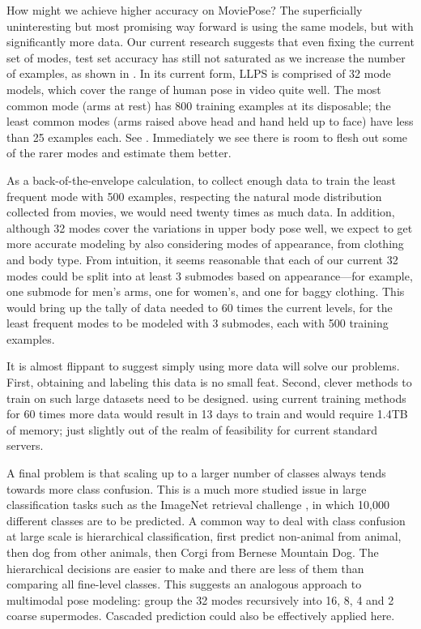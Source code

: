   How might we achieve higher accuracy on MoviePose?  The superficially 
uninteresting but most promising way forward is using the same models, but with 
significantly more data.  Our current research suggests that even fixing the 
current set of modes, test set accuracy has still not saturated as we increase 
the number of examples, as shown in .  In its 
current form, LLPS is comprised of 32 mode models, which cover the range of 
human pose in video quite well.  The most common mode (arms at rest) has 800 
training examples at its disposable; the least common modes (arms raised above 
head and hand held up to face) have less than 25 examples each.  See 
.  Immediately we see there is room to flesh out some 
of the rarer modes and estimate them better.  

As a back-of-the-envelope calculation, to collect enough data to train the 
least frequent mode with 500 examples, respecting the natural mode distribution 
collected from movies, we would need twenty times as much data.  In addition, 
although 32 modes cover the variations in upper body pose well, we expect to 
get more accurate modeling by also considering modes of appearance, from 
clothing and body type.  From intuition, it seems reasonable that each of our 
current 32 modes could be split into at least 3 submodes based on 
appearance---for example, one submode for men's arms, one for women's, and one 
for baggy clothing.  This would bring up the tally of data needed to 60 times 
the current levels, for the least frequent modes to be modeled with 3 submodes, 
each with 500 training examples.

It is almost flippant to suggest simply using more data will solve our 
problems.  First, obtaining and labeling this data is no small feat.  Second, 
clever methods to train on such large datasets need to be designed.  \Naively 
using current training methods for 60 times more data would result in 13 days 
to train and would require 1.4TB of memory; just slightly out of the realm of 
feasibility for current standard servers.  

A final problem is that scaling up to a larger number of classes always tends 
towards more class confusion.  This is a much more studied issue in large 
classification tasks such as the ImageNet retrieval challenge \citep{imagenet}, 
in which 10,000 different classes are to be predicted.
A common way to deal with class confusion at large scale is hierarchical 
classification, \eg first predict non-animal from animal, then dog from other 
animals, then Corgi from Bernese Mountain Dog.  The hierarchical decisions are 
easier to make and there are less of them than comparing all fine-level 
classes.  This suggests an analogous approach to multimodal pose modeling: 
group the 32 modes recursively into 16, 8, 4 and 2 coarse supermodes.  Cascaded 
prediction could also be effectively applied here.

